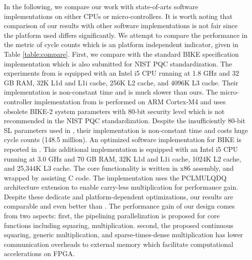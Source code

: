 \documentclass[runningheads]{llncs}
\begin{document}
In the following, we compare our work with state-of-arts software implementations on either CPUs or micro-controllers. It is worth noting that comparison of our results with other software implementations is not fair since the platform used differs significantly. We attempt to compare the performance in the metric of cycle counts which is an platform independent indicator, given in Table \ref{table:compare}.
First, we compare with the standard BIKE specification implementation \cite{aragon2017bike} which is also submitted for NIST PQC standardization. The experiments from \cite{von2014lightweight} is equipped with an Intel i5 CPU running at 1.8 GHz and 32 GB RAM, 32K L1d and L1i cache, 256K L2 cache, and 4096K L3 cache. Their implementation is non-constant time and is much slower than ours. The micro-controller implementation from \cite{maurich2015implementing} is performed on ARM Cortex-M4 and uses obsolete BIKE-2 system parameters with 80-bit security level which is not recommended in the NIST PQC standardization. Despite the insufficiently 80-bit SL parameters used in \cite{maurich2015implementing}, their implementation is non-constant time and costs huge cycle counts (148.5 million).  An optimized software implementation for BIKE is reported in \cite{drucker2017toolbox}. This additional implementation is equipped with an Intel i5 CPU running at 3.0 GHz and 70 GB RAM, 32K L1d and L1i cache, 1024K L2 cache, and 25,344K L3 cache. The core functionality is written in x86 assembly, and wrapped by assisting C code.
The implementation uses the PCLMULQDQ architecture extension to enable carry-less multiplication for performance gain. Despite these dedicate and platform-dependent optimizations, our results are comparable and even better than \cite{drucker2017toolbox}. The performance gain of our design comes from two aspects: first, the pipelining parallelization is proposed for core functions including squaring, multiplication. second, the proposed continuous squaring, generic multiplication, and sparse-times-dense multiplication has lower communication overheads to external memory which facilitate computational accelerations on FPGA.
\end{document}
